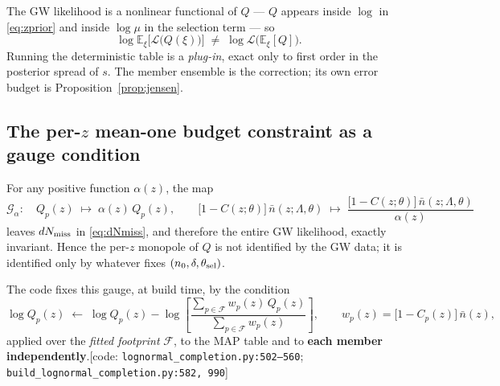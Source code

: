 \begin{remark}
\label{rem:plugin}
The GW likelihood is a nonlinear functional of $Q$ --- $Q$ appears inside
$\log$ in \eqref{eq:zprior} and inside $\log\mu$ in the selection term --- so
\begin{equation}
  \log\mathbb E_\xi\big[\mathcal L\big(Q(\xi)\big)\big]\;\neq\;
  \log\mathcal L\big(\mathbb E_\xi[Q]\big).
\end{equation}
Running the deterministic table is a \emph{plug-in}, exact only to first order
in the posterior spread of $s$.  The member ensemble is the correction; its own
error budget is Proposition~\ref{prop:jensen}.
\end{remark}

\subsection{The per-$z$ mean-one budget constraint as a gauge condition}

\begin{proposition}
\label{prop:gauge}
For any positive function $\alpha(z)$, the map
\begin{equation}
  \mathcal G_\alpha:\quad
  Q_p(z)\;\longmapsto\;\alpha(z)\,Q_p(z),
  \qquad
  \big[1-C(z;\theta)\big]\,\bar n(z;\Lambda,\theta)
  \;\longmapsto\;
  \frac{\big[1-C(z;\theta)\big]\,\bar n(z;\Lambda,\theta)}{\alpha(z)}
\end{equation}
leaves $dN_{\rm miss}$ in \eqref{eq:dNmiss}, and therefore the entire GW
likelihood, exactly invariant.  Hence the per-$z$ monopole of $Q$ is not
identified by the GW data; it is identified only by whatever fixes
$(n_0,\delta,\theta_{\rm sel})$.
\end{proposition}

The code fixes this gauge, at build time, by the condition
\begin{equation}
  \log Q_p(z)\;\longleftarrow\;\log Q_p(z)
  -\log\!\left[\frac{\sum_{p\in\mathcal F}w_p(z)\,Q_p(z)}{\sum_{p\in\mathcal F}w_p(z)}\right],
  \qquad
  w_p(z)=\big[1-C_p(z)\big]\,\bar n(z),
  \label{eq:renorm}
\end{equation}
applied over the \emph{fitted footprint} $\mathcal F$, to the MAP table and to
\textbf{each member independently}.\hfill[code:
\texttt{lognormal\_completion.py:502--560};
\texttt{build\_lognormal\_completion.py:582,\,990}]

